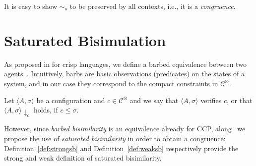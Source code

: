 \documentclass[main.tex]{subfiles}
\begin{document}
It is easy to show $ \sim_o$ to be preserved by all contexts, i.e., it is a \emph{congruence}.


\section{Saturated Bisimulation}\label{sec:saturated}
As proposed in \cite{pippo} for crisp languages, we define a barbed equivalence between two agents~\cite{barbed}.  
%
Intuitively, barbs are basic observations (predicates) on the states of a system, and in our case they correspond 
to the compact constraints in $\mathcal{C}^\otimes$.

\begin{definition} [Barbs]
Let $\langle A, \sigma \rangle$ be a configuration and $c \in \mathcal{C}^\otimes$
and we say that $\langle A, \sigma \rangle$ verifies $c$, or that $\langle A, \sigma \rangle \downarrow_c$ holds, if  $c \leq \sigma$.
\end{definition}

However, since \emph{barbed bisimilarity} is an equivalence already for CCP, along~\cite{pippo}
we propose the use of \emph{saturated bisimilarity}
in order to obtain a congruence:
%
Definition~\ref{def:strongsb} and Definition~\ref{def:weaksb} respectively provide the strong and weak definition of saturated bisimilarity.
\end{document}
